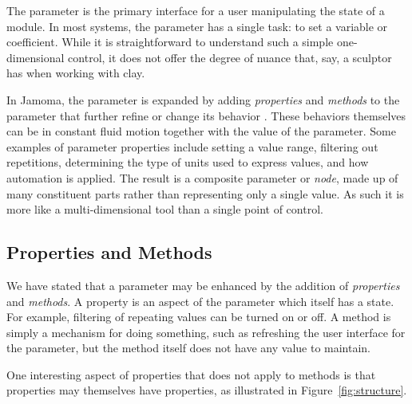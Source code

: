 \documentclass{article}
\begin{document}
The parameter is the primary interface for a user manipulating the state of a module. In most systems, the parameter has a single task: to set a variable or coefficient. While it is straightforward to understand such a simple one-dimensional control, it does not offer the degree of nuance that, say, a sculptor has when working with clay.

In Jamoma, the parameter is expanded by adding \emph{properties} and \emph{methods} to the parameter that further refine or change its behavior \cite{Place:2008}. These behaviors themselves can be in constant fluid motion together with the value of the parameter. Some examples of parameter properties include setting a value range, filtering out repetitions, determining the type of units used to express values, and how automation is applied.  The result is a composite parameter or \emph{node}, made up of many constituent parts rather than representing only a single value. As such it is more like a multi-dimensional tool than a single point of control.

\subsection{Properties and Methods} %
\label{sec:properties_and_methods}

We have stated that a parameter may be enhanced by the addition of \emph{properties} and \emph{methods}. A property is an aspect of the parameter which itself has a state. For example, filtering of repeating values can be turned on or off. A method is simply a mechanism for doing something, such as refreshing the user interface for the parameter, but the method itself does not have any value to maintain.

One interesting aspect of properties that does not apply to methods is that properties may themselves have properties, as illustrated in Figure~\ref{fig:structure}.
\end{document}
